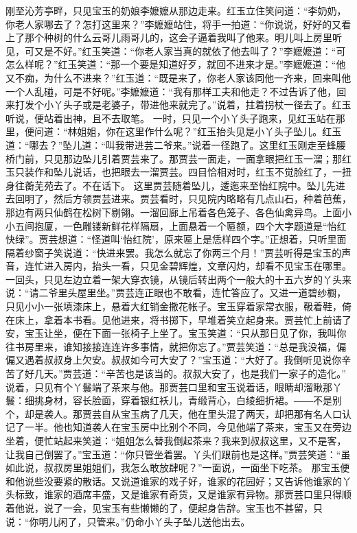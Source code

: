 \documentclass[12pt,oneside]{book}
\begin{document}
刚至沁芳亭畔，只见宝玉的奶娘李嬷嬷从那边走来。红玉立住笑问道：“李奶奶，你老人家哪去了？怎打这里来？”李嬷嬷站住，将手一拍道：“你说说，好好的又看上了那个种树的什么云哥儿雨哥儿的，这会子逼着我叫了他来。明儿叫上房里听见，可又是不好。”红玉笑道：“你老人家当真的就依了他去叫了？”李嬷嬷道：“可怎么样呢？”红玉笑道：“那一个要是知道好歹，就回不进来才是。”李嬷嬷道：“他又不痴，为什么不进来？”红玉道：“既是来了，你老人家该同他一齐来，回来叫他一个人乱碰，可是不好呢。”李嬷嬷道：“我有那样工夫和他走？不过告诉了他，回来打发个小丫头子或是老婆子，带进他来就完了。”说着，拄着拐杖一径去了。红玉听说，便站着出神，且不去取笔。
一时，只见一个小丫头子跑来，见红玉站在那里，便问道：“林姐姐，你在这里作什么呢？”红玉抬头见是小丫头子坠儿。红玉道：“哪去？”坠儿道：“叫我带进芸二爷来。”说着一径跑了。这里红玉刚走至蜂腰桥门前，只见那边坠儿引着贾芸来了。那贾芸一面走，一面拿眼把红玉一溜；那红玉只装作和坠儿说话，也把眼去一溜贾芸。四目恰相对时，红玉不觉脸红了，一扭身往蘅芜苑去了。不在话下。
这里贾芸随着坠儿，逶迤来至怡红院中。坠儿先进去回明了，然后方领贾芸进来。贾芸看时，只见院内略略有几点山石，种着芭蕉，那边有两只仙鹤在松树下剔翎。一溜回廊上吊着各色笼子、各色仙禽异鸟。上面小小五间抱厦，一色雕镂新鲜花样隔扇，上面悬着一个匾额，四个大字题道是“怡红快绿”。贾芸想道：“怪道叫‘怡红院’，原来匾上是恁样四个字。”正想着，只听里面隔着纱窗子笑说道：“快进来罢。我怎么就忘了你两三个月！”贾芸听得是宝玉的声音，连忙进入房内，抬头一看，只见金碧辉煌，文章闪灼，却看不见宝玉在哪里。一回头，只见左边立着一架大穿衣镜，从镜后转出两个一般大的十五六岁的丫头来说：“请二爷里头屋里坐。”贾芸连正眼也不敢看，连忙答应了。又进一道碧纱橱，只见小小一张填漆床上，悬着大红销金撒花帐子。宝玉穿着家常衣服，靸着鞋，倚在床上，拿着本书看。见他进来，将书掷下，早堆着笑立起身来。贾芸忙上前请了安，宝玉让坐，便在下面一张椅子上坐了。宝玉笑道：“只从那日见了你，我叫你往书房里来，谁知接接连连许多事情，就把你忘了。”贾芸笑道：“总是我没福，偏偏又遇着叔叔身上欠安。叔叔如今可大安了？”宝玉道：“大好了。我倒听见说你辛苦了好几天。”贾芸道：“辛苦也是该当的。叔叔大安了，也是我们一家子的造化。”
说着，只见有个丫鬟端了茶来与他。那贾芸口里和宝玉说着话，眼睛却溜瞅那丫鬟：细挑身材，容长脸面，穿着银红袄儿，青缎背心，白绫细折裙。――不是别个，却是袭人。那贾芸自从宝玉病了几天，他在里头混了两天，却把那有名人口认记了一半。他也知道袭人在宝玉房中比别个不同，今见他端了茶来，宝玉又在旁边坐着，便忙站起来笑道：“姐姐怎么替我倒起茶来？我来到叔叔这里，又不是客，让我自己倒罢了。”宝玉道：“你只管坐着罢。丫头们跟前也是这样。”贾芸笑道：“虽如此说，叔叔房里姐姐们，我怎么敢放肆呢？”一面说，一面坐下吃茶。
那宝玉便和他说些没要紧的散话。又说道谁家的戏子好，谁家的花园好；又告诉他谁家的丫头标致，谁家的酒席丰盛，又是谁家有奇货，又是谁家有异物。那贾芸口里只得顺着他说，说了一会，见宝玉有些懒懒的了，便起身告辞。宝玉也不甚留，只说：“你明儿闲了，只管来。”仍命小丫头子坠儿送他出去。
\end{document}
